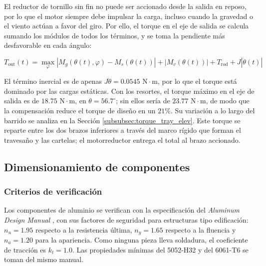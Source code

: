 \documentclass[../../General.tex]{subfiles}
\begin{document}
El reductor de tornillo sin fin no puede ser accionado desde la salida en reposo, por lo que el motor siempre debe impulsar la carga, incluso cuando la gravedad o el viento actúan a favor del giro. Por ello, el torque en el eje de salida se calcula sumando los módulos de todos los términos, y se toma la pendiente más desfavorable en cada ángulo:

\begin{equation}\label{eq:Tout_elev}
    T_{\text{out}}(t) = \max_{\varphi}\left|M_g\!\left(\theta(t), \varphi\right) - M_s\!\left(\theta(t)\right)\right| + \left|M_v\!\left(\theta(t)\right)\right| + T_{\text{rod}} + J\left|\ddot{\theta}(t)\right|
\end{equation}

El término inercial es de apenas $J\ddot{\theta} = 0.0545\text{ N}\cdot\text{m}$, por lo que el torque está dominado por las cargas estáticas. Con los resortes, el torque máximo en el eje de salida es de $18.75\text{ N}\cdot\text{m}$, en $\theta = 56.7^\circ$; sin ellos sería de $23.77\text{ N}\cdot\text{m}$, de modo que la compensación reduce el torque de diseño en un $21\%$. Su variación a lo largo del barrido se analiza en la Sección \ref{subsubsec:torque_tray_elev}. Este torque se reparte entre los dos brazos inferiores a través del marco rígido que forman el travesaño y las cartelas; el motorreductor entrega el total al brazo accionado.

\subsection{Dimensionamiento de componentes}\label{subsec:dimensionamiento_elev}

\subsubsection{Criterios de verificación}

Los componentes de aluminio se verifican con la especificación del \textit{Aluminum Design Manual} \citep{aluminum2005manual}, con sus factores de seguridad para estructuras tipo edificación: $n_u = 1.95$ respecto a la resistencia última, $n_y = 1.65$ respecto a la fluencia y $n_a = 1.20$ para la apariencia. Como ninguna pieza lleva soldadura, el coeficiente de tracción es $k_t = 1.0$. Las propiedades mínimas del 5052-H32 y del 6061-T6 se toman del mismo manual.
\end{document}

